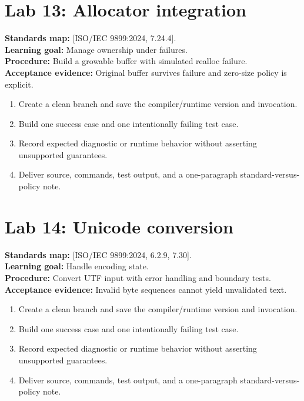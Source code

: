 \documentclass[10pt,letterpaper,oneside]{report}
\newcommand{\refcl}[1]{\textsf{\footnotesize[ISO/IEC 9899:2024, #1]}}
\begin{document}
\section{Lab 13: Allocator integration}
\textbf{Standards map:} \refcl{7.24.4}.\\
\textbf{Learning goal:} Manage ownership under failures.\\
\textbf{Procedure:} Build a growable buffer with simulated realloc failure.\\
\textbf{Acceptance evidence:} Original buffer survives failure and zero-size policy is explicit.
\begin{enumerate}
\item Create a clean branch and save the compiler/runtime version and invocation.
\item Build one success case and one intentionally failing test case.
\item Record expected diagnostic or runtime behavior without asserting unsupported guarantees.
\item Deliver source, commands, test output, and a one-paragraph standard-versus-policy note.
\end{enumerate}

\section{Lab 14: Unicode conversion}
\textbf{Standards map:} \refcl{6.2.9, 7.30}.\\
\textbf{Learning goal:} Handle encoding state.\\
\textbf{Procedure:} Convert UTF input with error handling and boundary tests.\\
\textbf{Acceptance evidence:} Invalid byte sequences cannot yield unvalidated text.
\begin{enumerate}
\item Create a clean branch and save the compiler/runtime version and invocation.
\item Build one success case and one intentionally failing test case.
\item Record expected diagnostic or runtime behavior without asserting unsupported guarantees.
\item Deliver source, commands, test output, and a one-paragraph standard-versus-policy note.
\end{enumerate}
\end{document}

